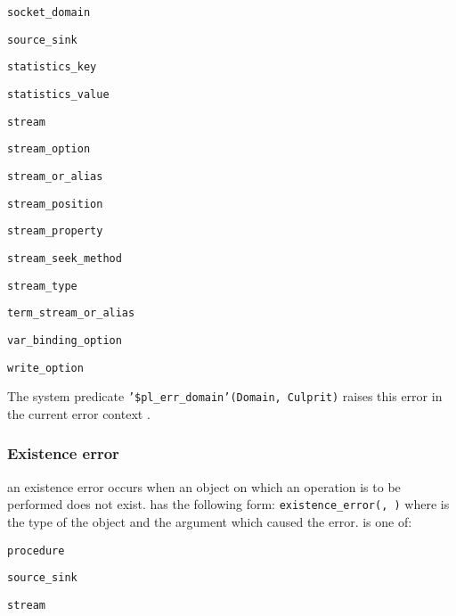 \begin{ItemizeThreeCols}
\item \texttt{socket\_domain}

\item \texttt{source\_sink}

\item \texttt{statistics\_key}

\item \texttt{statistics\_value}

\item \texttt{stream}

\item \texttt{stream\_option}

\item \texttt{stream\_or\_alias}

\item \texttt{stream\_position}

\item \texttt{stream\_property}

\item \texttt{stream\_seek\_method}

\item \texttt{stream\_type}

\item \texttt{term\_stream\_or\_alias}

\item \texttt{var\_binding\_option}

\item \texttt{write\_option}

\end{ItemizeThreeCols}

The system predicate \texttt{'\$pl\_err\_domain'(Domain, Culprit)} raises
this error in the current error context .

\subsubsection{Existence error}
\label{Existence-error}
an existence error occurs when an object on which an operation is to be
performed does not exist.  has the following
form: \texttt{existence\_error(, )} where
 is the type of the object and
 the argument which caused the error.
 is one of:

\begin{ItemizeThreeCols}

\item \texttt{procedure}

\item \texttt{source\_sink}

\item \texttt{stream}

\end{ItemizeThreeCols}

